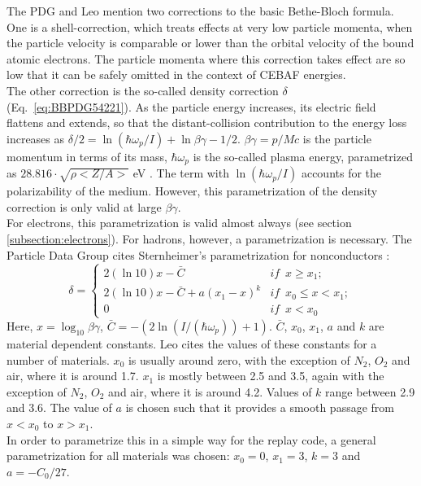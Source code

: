 The PDG and Leo \cite{leo,PDG54} mention two corrections to the basic Bethe-Bloch formula.
One is a shell-correction, which treats effects at very low particle momenta, when the
particle velocity is comparable or lower than the orbital velocity of the bound atomic 
electrons. The particle momenta where this correction takes effect are so low that it can
be safely omitted in the context of CEBAF energies.\\
The other correction is the so-called density correction $\delta$ 
(Eq.~\ref{eq:BBPDG54221}). As the particle energy increases, its electric field flattens
and extends, so that the distant-collision contribution to the energy loss increases as
$\delta/2=\ln{(\hbar \omega_p / I)}+\ln{\beta \gamma}-1/2$. $\beta\gamma = p/Mc$ is the 
particle momentum in terms of its mass, $\hbar \omega_p$ is the so-called plasma energy, 
parametrized as $28.816 \cdot \sqrt{\rho <Z/A>}$ eV \cite{leo,PDG54}. The term with 
$\ln{(\hbar\omega_p/I)}$ accounts for the polarizability of the medium. However, this 
parametrization of the density correction is only valid at large $\beta\gamma$.\\ 
For electrons, this parametrization is valid almost always (see section 
\ref{subsection:electrons}). For hadrons, however, a parametrization is necessary.
The Particle Data Group \cite{PDG54} cites Sternheimer's parametrization for nonconductors
\cite{Sternheimer}:
\begin{equation}
\label{eq:denscorr}
 \delta= \left\{ 
              \begin{array}{ll}
	        2(\ln{10})x-\bar{C} & if\hspace{6pt} x \geq x_1; \\
		2(\ln{10})x-\bar{C}+a(x_1-x)^k & if\hspace{6pt} x_0 \leq x < x_1; \\
		0 & if\hspace{6pt} x<x_0
	      \end{array}
           \right. 
\end{equation}
Here, $x=\log_{10}{\beta\gamma}$, $\bar{C}=-(2\ln{(I/(\hbar\omega_p))}+1)$. $\bar{C}$,
$x_0$, $x_1$, $a$ and $k$ are material dependent constants. Leo \cite{leo} cites the
values of these constants for a number of materials. $x_0$ is usually around zero, with
the exception of $N_2$, $O_2$ and air, where it is around 1.7. $x_1$ is mostly 
between 2.5 and 3.5, again with the exception of $N_2$, $O_2$ and air, where it is around
4.2. Values of $k$ range between 2.9 and 3.6. The value of $a$ is chosen such that it
provides a smooth passage from $x<x_0$ to $x>x_1$.\\
In order to parametrize this in a simple way for the replay code, a general
parametrization for all materials was chosen: $x_0=0$, $x_1=3$, $k=3$ and $a=-C_0/27$.\\

